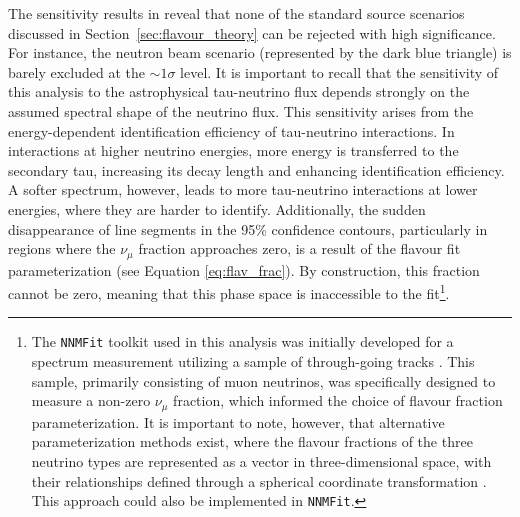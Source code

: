 The sensitivity results in  reveal that none of the standard source scenarios discussed in Section~\ref{sec:flavour_theory} can be rejected with high significance. For instance, the neutron beam scenario (represented by the dark blue triangle) is barely excluded at the $\sim1\sigma$ level. It is important to recall that the sensitivity of this analysis to the astrophysical tau-neutrino flux depends strongly on the assumed spectral shape of the neutrino flux. This sensitivity arises from the energy-dependent identification efficiency of tau-neutrino interactions. In interactions at higher neutrino energies, more energy is transferred to the secondary tau, increasing its decay length and enhancing identification efficiency. A softer spectrum, however, leads to more tau-neutrino interactions at lower energies, where they are harder to identify. Additionally, the sudden disappearance of line segments in the 95\% confidence contours, particularly in regions where the $\nu_\mu$ fraction approaches zero, is a result of the flavour fit parameterization (see Equation \ref{eq:flav_frac}). By construction, this fraction cannot be zero, meaning that this phase space is inaccessible to the fit\footnote{The \texttt{NNMFit} toolkit used in this analysis was initially developed for a spectrum measurement utilizing a sample of through-going tracks \cite{diffusenumu}. This sample, primarily consisting of muon neutrinos, was specifically designed to measure a non-zero \(\nu_{\mu}\) fraction, which informed the choice of flavour fraction parameterization. It is important to note, however, that alternative parameterization methods exist, where the flavour fractions of the three neutrino types are represented as a vector in three-dimensional space, with their relationships defined through a spherical coordinate transformation \cite{golemflavor}. This approach could also be implemented in \texttt{NNMFit}.}.

